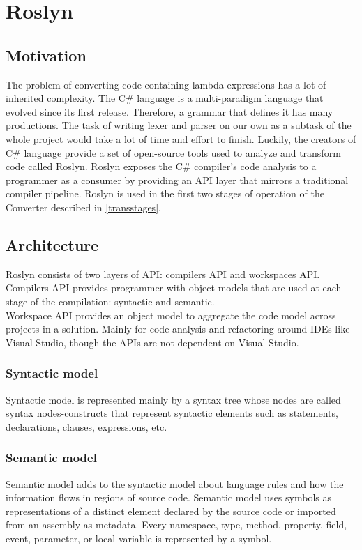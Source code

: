 \documentclass[]{report}
\begin{document}
    \section{Roslyn}
    \subsection{Motivation}
    The problem of converting code containing lambda expressions has a lot of inherited complexity. The C\# language is a multi-paradigm language that evolved since its first release. Therefore, a grammar that defines it has many productions. The task of writing lexer and parser on our own as a subtask of the whole project would take a lot of time and effort to finish. Luckily, the creators of C\# language provide a set of open-source tools used to analyze and transform code called Roslyn. Roslyn exposes the C\#  compiler’s code analysis to a programmer as a consumer by providing an API layer that mirrors a traditional compiler pipeline. \cite{roslynrepo} Roslyn is used in the first two stages of operation of the Converter described in \ref{transstages}.

    \subsection{Architecture}
   
    Roslyn consists of two layers of API: compilers API and workspaces API.\\
    Compilers API provides programmer with object models that are used at each stage of the compilation: syntactic and semantic.\\
    Workspace API provides an object model to aggregate the code model across projects in a solution. Mainly for code analysis and refactoring around IDEs like Visual Studio, though the APIs are not dependent on Visual Studio\cite{workspaceapi}. 
    
    \subsubsection{Syntactic model}
    Syntactic model is represented mainly by a syntax tree whose nodes are called syntax nodes-constructs that represent syntactic elements such as statements, declarations, clauses, expressions, etc.\\
    
    \subsubsection{Semantic model}
    Semantic model adds to the syntactic model about language rules and how the information flows in regions of source code. 
    Semantic model uses symbols as representations of a distinct element declared by the source code or imported from an assembly as metadata. Every namespace, type, method, property, field, event, parameter, or local variable is represented by a symbol\cite{roslynoverview}.
    
\end{document}
